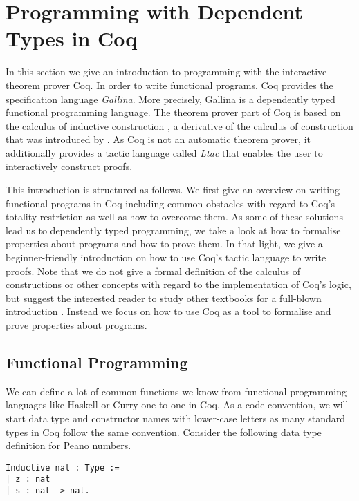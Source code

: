 \section{Programming with Dependent Types in Coq}
\label{sec:progDT}

In this section we give an introduction to programming with the interactive theorem prover Coq.
In order to write functional programs, Coq provides the specification language \emph{Gallina}.
More precisely, Gallina is a dependently typed functional programming language.
The theorem prover part of Coq is based on the calculus of inductive construction \citep{coquand1988inductively}, a derivative of the calculus of construction that was introduced by \citet{coquand1986calculus}.
As Coq is not an automatic theorem prover, it additionally provides a tactic language called \emph{Ltac} that enables the user to interactively construct proofs.

This introduction is structured as follows.
We first give an overview on writing functional programs in Coq including common obstacles with regard to Coq's totality restriction as well as how to overcome them.
As some of these solutions lead us to dependently typed programming, we take a look at how to formalise properties about programs and how to prove them.
In that light, we give a beginner-friendly introduction on how to use Coq's tactic language to write proofs.
Note that we do not give a formal definition of the calculus of constructions or other concepts with regard to the implementation of Coq's logic, but suggest the interested reader to study other textbooks for a full-blown introduction \citep{pierce2010software, chlipala2011certified}.
Instead we focus on how to use Coq as a tool to formalise and prove properties about programs.

\subsection{Functional Programming}

We can define a lot of common functions we know from functional programming languages like Haskell or Curry one-to-one in Coq.
As a code convention, we will start data type and constructor names with lower-case letters as many standard types in Coq follow the same convention.
Consider the following data type definition for Peano numbers.

\begin{verbatim}
Inductive nat : Type :=
| z : nat
| s : nat -> nat.
\end{verbatim}


